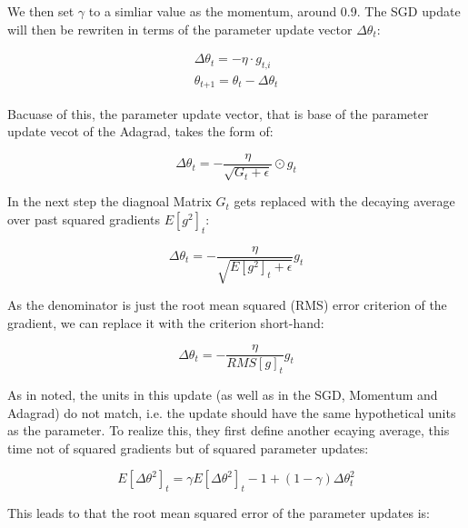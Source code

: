 \documentclass[12pt,oneside,a4paper,parskip]{scrbook}
\begin{document}
We then set $\gamma$ to a simliar value as the momentum, around 0.9. The SGD update will then be rewriten in terms of the 
parameter update vector $\Delta\theta_\textit{t}$:

\begin{equation}
  \begin{split}
    \Delta\theta_\textit{t} = -\eta \cdot \textit{g}_\textit{t,i} \\
    \theta_\textit{t+1} = \theta_\textit{t} - \Delta\theta_\textit{t}
  \end{split}
\end{equation}

Bacuase of this, the parameter update vector, that is base of the parameter update vecot of the Adagrad, takes the form of:

\begin{equation}
  \Delta\theta_\textit{t} = -\frac{\eta}{\sqrt{\textit{G}_\textit{t} + \epsilon}} \odot \textit{g}_\textit{t}
\end{equation}

In the next step the diagnoal Matrix $\textit{G}_t$ gets replaced with the decaying average over past squared gradients 
$\textit{E}[\textit{g}^2]_\textit{t}$:

\begin{equation}
  \Delta\theta_\textit{t} = -\frac{\eta}{\sqrt{\textit{E}[\textit{g}^2]_\textit{t} + \epsilon}} \textit{g}_\textit{t}
\end{equation}

As the denominator is just the root mean squared (RMS) error criterion of the gradient, we can replace
it with the criterion short-hand: 

\begin{equation}
  \Delta\theta_\textit{t} = -\frac{\eta}{RMS[\textit{g}]_t} \textit{g}_\textit{t}
\end{equation}

As in \cite{AdadeltaAddition} noted, the units in this update (as well as in the SGD, Momentum and Adagrad) do not match,
i.e. the update should have the same hypothetical units as the parameter. To realize this, they first define another 
ecaying average, this time not of squared gradients but of squared parameter updates:

\begin{equation}
  \textit{E}[\Delta\theta^2]_t = \gamma\textit{E}[\Delta\theta^2]_t-1 + (1-\gamma)\Delta\theta^2_t
\end{equation}

This leads to that the root mean squared error of the parameter updates is:
\end{document}
